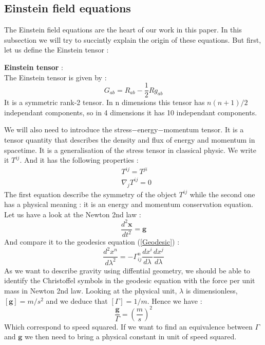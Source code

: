 \documentclass[a4paper,12pt]{article}
\theoremstyle{definition}
\begin{document}
\subsection{Einstein field equations}
The Einstein field equations are the heart of our work in this paper.
In this subsection we will try to succintly explain the origin of these equations.
But first, let us define the Einstein tensor : 
\begin{definition}
	\textbf{Einstein tensor} :\\
	The Einstein tensor is given by :
	\begin{equation}
		G_{ab}=R_{ab}-\frac{1}{2}Rg_{ab}
	\end{equation}
	It is a symmetric rank-2 tensor. In n dimensions this tensor has $n(n+1)/2$ independant components, so in 4 dimensions it has 10 independant components.
\end{definition}
We will also need to introduce the stress$-$energy$-$momentum tensor.
It is a tensor quantity that describes the density and flux of energy and momentum in spacetime.
It is a generalisation of the stress tensor in classical physic.
We write it $T^{ij}$.
And it has the following properties :
\begin{align}
	&T^{ij}=T^{ji}\\
	&\nabla_j T^{ij}=0\label{conserv}
\end{align}
The first equation describe the symmetry of the object $T^{ij}$ while the second one has a physical meaning : it is an energy and momentum conservation equation.\\
Let us have a look at the Newton 2nd law :
\begin{equation}
	\frac{d^2\boldsymbol{x}}{dt^2}=\boldsymbol{g}
\end{equation}
And compare it to the geodesics equation (\ref{Geodesic}) :
\begin{equation}
	\frac{d^2x^n}{d\lambda^2}=-\Gamma^n_{ij}\frac{dx^i}{d\lambda}\frac{dx^j}{d\lambda}
\end{equation}
As we want to describe gravity using diffential geometry, we should be able to identify the Christoffel symbols in the geodesic equation with the force per unit mass in Newton 2nd law.
Looking at the physical unit, $\lambda$ is dimensionless, $[\boldsymbol{g}]=m/s^2$ and we deduce that $[\Gamma]=1/m$.
Hence we have :
\begin{equation}
	\frac{\boldsymbol{g}}{\Gamma}=(\frac{m}{s})^2
\end{equation}
Which correspond to speed squared.
If we want to find an equivalence between $\Gamma$ and $\boldsymbol{g}$ we then need to bring a physical constant in unit of speed squared.
\end{document}

